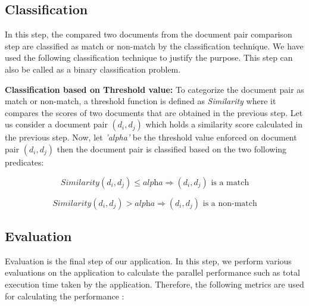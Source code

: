\subsection{Classification}
\label{section: classification}
\par In this step, the compared two documents from the document pair comparison step are classified as match or non-match by the classification technique. We have used the following classification technique to justify the purpose. This step can also be called as a binary classification problem.

\textbf{Classification based on Threshold value:} To categorize the document pair as match or non-match, a threshold function is defined as \textit{Similarity} where it compares the scores of two documents that are obtained in the previous step. Let us consider a document pair \((d_i, d_j)\) which holds a similarity score calculated in the previous step. Now, let \textit{'alpha'} be the threshold value enforced on document pair  \((d_i, d_j)\)  then the document pair is classified based on the two following predicates:

\begin{equation}\label{formula: threshold value for match}
\textit{Similarity\((d_i, d_j)\)}   \leq   \textit{alpha}  \Rightarrow (d_i, d_j)  \text{ is a match}
\end{equation}

\begin{equation}\label{formula: threshold value for non-match}
\textit{Similarity\((d_i, d_j)\)}   >  \textit{alpha}  \Rightarrow (d_i, d_j)  \text{ is a non-match}
\end{equation}

\subsection{Evaluation}
\label{section: evaluation}
Evaluation is the final step of our application. In this step, we perform various evaluations on the application to calculate the parallel performance such as total execution time taken by the application. Therefore, the following metrics are used for calculating the performance \cite{wilkinson1999parallel}: 

